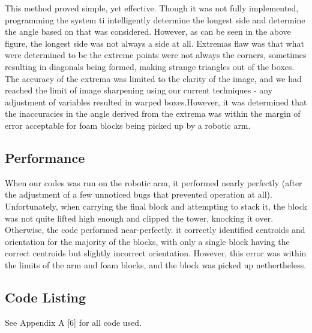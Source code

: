 	This method proved simple, yet effective. Though it was not fully implemented, programming the system ti intelligently determine the longest side and determine the angle based on that was considered. However, as can be seen in the above figure, the longest side was not always a side at all. Extremas flaw was that what were determined to be the extreme points were not always the corners, sometimes resulting in diagonals being formed, making strange triangles out of the boxes. The accuracy of the extrema was limited to the clarity of the image, and we had reached the limit of image sharpening using our current techniques - any adjustment of variables resulted in warped boxes.\newline However, it was determined that the inaccuracies in the angle derived from the extrema was within the margin of error acceptable for foam blocks being picked up by a robotic arm.\newline \newline
	
	
	\subsection{Performance}
	\newline
	When our codes was run on the robotic arm, it performed nearly perfectly (after the adjustment of a few unnoticed bugs that prevented operation at all). Unfortunately, when carrying the final block and attempting to stack it, the block was not quite lifted high enough and clipped the tower, knocking it over. Otherwise, the code performed near-perfectly. it correctly identified centroids and orientation for the majority of the blocks, with only a single block having the correct centroids but slightly incorrect orientation. However, this error was within the limits of the arm and foam blocks, and the block was picked up nethertheless.\newline \newline
	
	\subsection*{Code Listing}
	See Appendix A [6] for all code used.

\pagebreak